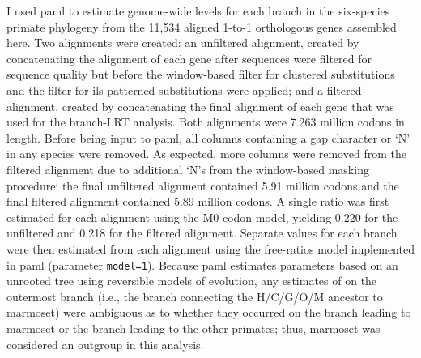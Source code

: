 I used \ac{paml} to estimate genome-wide \dnds levels for each branch
in the six-species primate phylogeny from the 11,534 aligned 1-to-1
orthologous genes assembled here. Two alignments were created: an
unfiltered alignment, created by concatenating the alignment of each
gene after sequences were filtered for sequence quality but before the
window-based filter for clustered \nsyn substitutions and the filter
for \ac{ils}-patterned substitutions were applied; and a filtered
alignment, created by concatenating the final alignment of each gene
that was used for the branch-LRT analysis. Both alignments were 7.263
million codons in length. Before being input to \ac{paml}, all columns
containing a gap character or `N' in any species were removed. As
expected, more columns were removed from the filtered alignment due to
additional `N's from the window-based masking procedure: the final
unfiltered alignment contained 5.91 million codons and the final
filtered alignment contained 5.89 million codons. A single \dnds ratio
was first estimated for each alignment using the M0 codon model,
yielding 0.220 for the unfiltered and 0.218 for the filtered
alignment. Separate \dnds values for each branch were then estimated
from each alignment using the free-ratios model implemented in
\ac{paml} (parameter \texttt{model=1}). Because \ac{paml} estimates
parameters based on an unrooted tree using reversible models of
evolution, any estimates of \dnds on the outermost branch (i.e., the
branch connecting the H/C/G/O/M ancestor to marmoset) were ambiguous
as to whether they occurred on the branch leading to marmoset or the
branch leading to the other primates; thus, marmoset was considered an
outgroup in this analysis.

